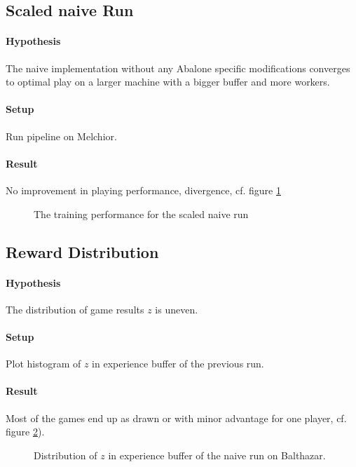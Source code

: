 \subsection{Scaled naive Run}
\paragraph{Hypothesis} The naive implementation without any Abalone specific modifications converges to optimal play on a larger machine with a bigger buffer and more workers.
\paragraph{Setup} Run pipeline on Melchior.
\paragraph{Result} No improvement in playing performance, divergence, cf. figure \ref{performance_remote_naive}
\begin{figure}[!h]
    \centering
    \hfill
    \caption{The training performance for the scaled naive run}
    \label{performance_remote_naive}
\end{figure}

\subsection{Reward Distribution}
\paragraph{Hypothesis} The distribution of game results $z$ is uneven.
\paragraph{Setup} Plot histogram of $z$ in experience buffer of the previous run.
\paragraph{Result} Most of the games end up as drawn or with minor advantage for one player, cf. figure \ref{distribution_of_rewards}).

\begin{figure}[!h]
    \centering
    \hfill
    \caption{Distribution of $z$ in experience buffer of the naive run on Balthazar.}
    \label{distribution_of_rewards}
\end{figure}

